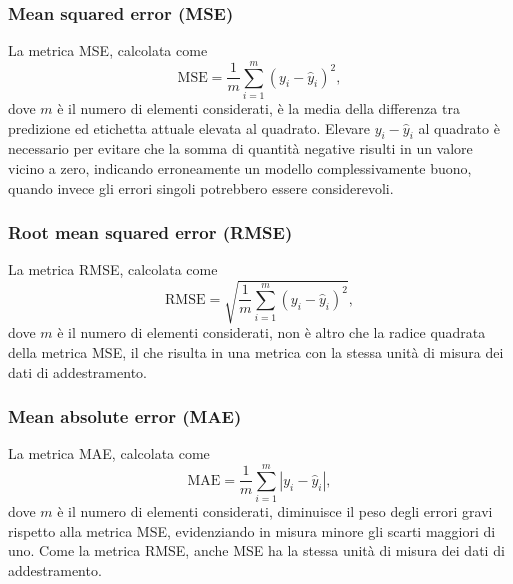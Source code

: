 \subsubsection{Mean squared error (MSE)}
La metrica MSE, calcolata come
\begin{equation*}
    \textrm{MSE} = \frac{1}{m} \sum_{i=1}^{m} (y_i - \hat{y}_i)^2,
\end{equation*}
dove $m$ è il numero di elementi considerati, è la media della differenza tra predizione ed etichetta attuale elevata al quadrato. 
Elevare $y_i - \hat{y}_i$ al quadrato è necessario per evitare che la somma di quantità negative risulti in un valore vicino a zero, indicando erroneamente un modello complessivamente buono, quando invece gli errori singoli potrebbero essere considerevoli.

\subsubsection{Root mean squared error (RMSE)}
La metrica RMSE, calcolata come
\begin{equation*}    
    \textrm{RMSE} = \sqrt{\frac{1}{m} \sum_{i=1}^{m} (y_i - \hat{y}_i)^2},
\end{equation*}
dove $m$ è il numero di elementi considerati, non è altro che la radice quadrata della metrica MSE, il che risulta in una metrica con la stessa unità di misura dei dati di addestramento. 

\subsubsection{Mean absolute error (MAE)}
La metrica MAE, calcolata come
\begin{equation*}    
    \textrm{MAE} = \frac{1}{m} \sum_{i=1}^{m} |y_i - \hat{y}_i|,
\end{equation*}
dove $m$ è il numero di elementi considerati, diminuisce il peso degli errori gravi rispetto alla metrica MSE, evidenziando in misura minore gli scarti maggiori di uno.
Come la metrica RMSE, anche MSE ha la stessa unità di misura dei dati di addestramento. 

